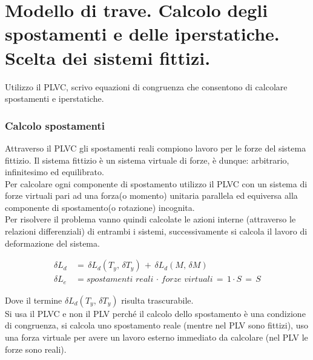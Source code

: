 \section{Modello di trave. Calcolo degli spostamenti e delle iperstatiche. Scelta dei sistemi fittizi.}

Utilizzo il PLVC, scrivo equazioni di congruenza che consentono di calcolare spostamenti e iperstatiche.
\subsubsection*{Calcolo spostamenti}
Attraverso il PLVC gli spostamenti reali compiono lavoro per le forze del sistema fittizio.
Il sistema fittizio è un sistema virtuale di forze, è dunque: arbitrario, infinitesimo ed equilibrato.\\
Per calcolare ogni componente di spostamento utilizzo il PLVC con un sistema di forze virtuali pari ad una forza(o momento) unitaria parallela ed equiversa alla componente di spostamento(o rotazione) incognita.\\
Per risolvere il problema vanno quindi calcolate le azioni interne (attraverso le relazioni differenziali) di entrambi i sistemi, successivamente si calcola il lavoro di deformazione del sistema.

\begin{align*}
    \delta L_d \,&=\, \delta L_d(T_y, \, \delta T_y)\,+\,\delta L_d(M, \, \delta M)\\
    \delta L_e &= \textit{spostamenti reali} \, \cdot\, \textit{forze virtuali} \,= \, 1\cdot S \,=\, S
\end{align*}

Dove il termine $ \delta L_d(T_y, \, \delta T_y)$ risulta trascurabile.\\

Si usa il PLVC e non il PLV perché il calcolo dello spostamento è una condizione di congruenza, si calcola uno spostamento reale (mentre nel PLV sono fittizi), uso una forza virtuale per avere un lavoro esterno immediato da calcolare (nel PLV le forze sono reali).

